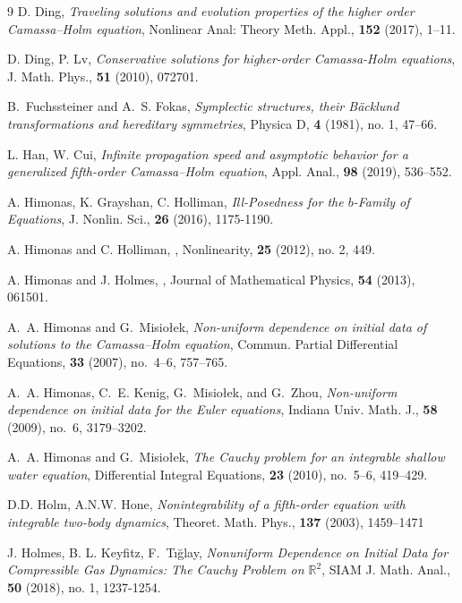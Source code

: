 \documentclass[reqno]{amsart}
\theoremstyle{plain}
\numberwithin{equation}{section}
\newcommand{\rr}{\mathbb{R}}
\begin{document}
\begin{thebibliography}{9}
D. Ding, \textit{Traveling solutions and evolution properties of the higher order Camassa–Holm equation}, Nonlinear Anal: Theory Meth. Appl., \textbf{152} (2017),
1–11.

D. Ding, P. Lv, \textit{Conservative solutions for higher-order Camassa-Holm equations}, J. Math. Phys., \textbf{51} (2010), 072701.

B.~Fuchssteiner and A.~S. Fokas,
\textit{Symplectic structures, their Bäcklund transformations and hereditary symmetries},
Physica D, \textbf{4} (1981), no. 1, 47–66.

L. Han, W. Cui, \textit{Infinite propagation speed and asymptotic behavior for a generalized fifth-order Camassa–Holm equation}, Appl. Anal., \textbf{98} (2019),
536–552.

A. Himonas, K. Grayshan, C. Holliman, \textit{Ill-Posedness for the $b$-Family of Equations}, J. Nonlin. Sci., \textbf{26} (2016), 1175-1190.

A. Himonas and C. Holliman,
,
\newblock Nonlinearity, \textbf{25} (2012), no. 2, 449.

A. Himonas and J. Holmes,
,
\newblock Journal of Mathematical Physics, \textbf{54} (2013), 061501.


A.~A. Himonas and G.~Misiołek,
\textit{Non-uniform dependence on initial data of solutions to the Camassa--Holm equation},
Commun. Partial Differential Equations, \textbf{33} (2007), no.~4--6, 757--765.

A.~A. Himonas, C.~E. Kenig, G.~Misiołek, and G.~Zhou,
\textit{Non-uniform dependence on initial data for the Euler equations},
Indiana Univ. Math. J., \textbf{58} (2009), no.~6, 3179--3202.

A.~A. Himonas and G.~Misiołek,
\textit{The Cauchy problem for an integrable shallow water equation},
Differential Integral Equations, \textbf{23} (2010), no.~5--6, 419--429.

D.D. Holm, A.N.W. Hone, \textit{Nonintegrability of a fifth-order equation with integrable two-body dynamics}, Theoret. Math. Phys., \textbf{137} (2003), 1459–1471

J. Holmes, B. L. Keyfitz, F.~Tığlay, \textit{Nonuniform Dependence on Initial Data for Compressible Gas Dynamics: The Cauchy Problem on $\rr^2$}, SIAM J. Math. Anal., \textbf{50} (2018), no. 1, 1237-1254.


\end{thebibliography}
\end{document}
